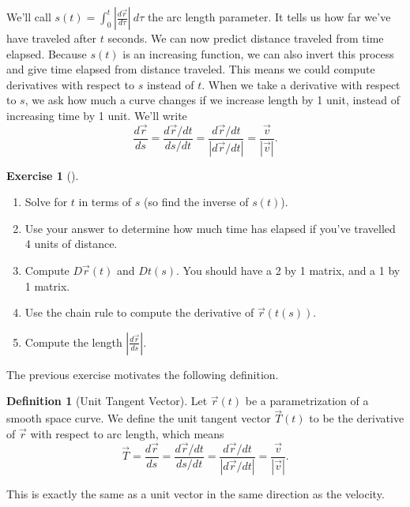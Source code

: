 \documentclass[10pt,]{book}
\theoremstyle{plain}
\theoremstyle{definition}
\newtheorem{definition}[theorem]{Definition}
\theoremstyle{definition}
\theoremstyle{definition}
\theoremstyle{definition}
\newtheorem{exploration}[project]{Exercise}
\theoremstyle{definition}
\numberwithin{equation}{section}
\newcommand{\ds}{\displaystyle}
\begin{document}
We'll call \(\ds s(t)=\int_0^t \left|\frac {d\vec r}{d\tau}\right|\ d\tau\) the arc length parameter. It tells us how far we've have traveled after \(t\) seconds. We can now predict distance traveled from time elapsed. Because \(s(t)\) is an increasing function, we can also invert this process and give time elapsed from distance traveled. This means we could compute derivatives with respect to \(s\) instead of \(t\). When we take a derivative with respect to \(s\), we ask how much a curve changes if we increase length by 1 unit, instead of increasing time by 1 unit. We'll write%
\begin{equation*}
\ds\frac{d\vec r}{ds} =\ds\frac{d\vec r/dt}{ds/dt} = \frac{d\vec r/dt}{|d\vec r/dt|} = \frac{\vec v}{|\vec{v}|}.
\end{equation*}
%
\begin{exploration}[]\label{exploration-168}
\leavevmode%
\begin{enumerate}[font=\bfseries,label=(\alph*),ref=\alph*]
\item\label{task-393} Solve for \(t\) in terms of \(s\) (so find the inverse of \(s(t)\)).%
\item\label{task-394} Use your answer to determine how much time has elapsed if you've travelled 4 units of distance.%
\item\label{task-395} Compute \(D\vec r(t)\) and \(Dt(s)\).  You should have a 2 by 1 matrix, and a 1 by 1 matrix.%
\item\label{task-396} Use the chain rule to compute the derivative of \(\vec r(t(s))\).%
\item\label{task-397} Compute the length \(\left|\ds\frac{d\vec r}{ds}\right|\).%
\end{enumerate}
\end{exploration}
The previous exercise motivates the following definition.%
\begin{definition}[{Unit Tangent Vector}]\label{def_unit_tangent_vector}
Let \(\vec r(t)\) be a parametrization of a smooth space curve. We define the unit tangent vector \(\vec T(t)\) to be the derivative of \(\vec r\) with respect to arc length, which means%
\begin{equation*}
\vec T = \ds\frac{d\vec r}{ds}=\ds\frac{d\vec r/dt}{ds/dt} = \frac{d\vec r/dt}{|d \vec r/dt|} = \frac{\vec v}{|\vec v|}.
\end{equation*}
%
\par
This is exactly the same as a unit vector in the same direction as the velocity.%
\end{definition}
\end{document}
